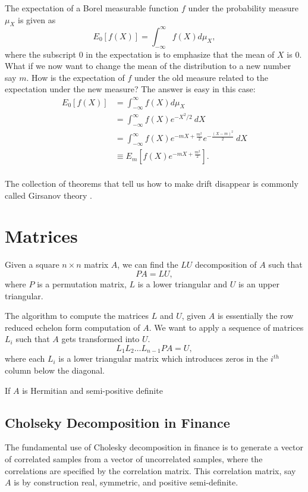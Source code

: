 \documentclass{amsart}
\theoremstyle{plain}
\numberwithin{equation}{section}
\begin{document}
The expectation of a Borel measurable function 
$f$ under the probability measure 
$\mu_X$ is given as
\begin{equation*}
E_0[f(X)] = \int_{-\infty}^{\infty} f(X) d\mu_X,
\end{equation*}
where the subscript $0$ in the expectation is to 
emphasize that the mean of $X$ is $0$. What if
we now want to change the mean of the distribution
to a new number say $m$. How is the expectation of
$f$ under the old measure related to the 
expectation under the new measure?
The answer is easy in this case:
\begin{align*}
E_0[f(X)] &= \int_{-\infty}^{\infty} f(X) d\mu_X \\
					&= \int_{-\infty}^{\infty} f(X) e^{-X^2/2} \: dX \\
					&= \int_{-\infty}^{\infty} f(X) e^{-mX + \frac{m^2}{2}}e^{-\frac{(X-m)^2}{2}} \: dX \\
					&\equiv E_m\left[f(X)e^{-mX + \frac{m^2}{2}}\right].\\
\end{align*}


The collection of theorems that tell us how to make 
drift disappear is commonly called Girsanov theory
\cite[Ch.\ 13]{steele2001stochastic}.


\section{Matrices}
Given a square $n \times n$ matrix $A$, we can find the $LU$ decomposition 
of $A$ such that 
\begin{equation}
PA = LU,
\label{eq:LU}
\end{equation}
where $P$ is a permutation matrix, $L$ is a lower triangular
and $U$ is an upper triangular.

The algorithm to compute the matrices $L$ and $U$, given $A$ is 
essentially the row reduced echelon form computation of $A$. 
We want to apply a sequence of matrices $L_i$ such that 
$A$ gets transformed into $U$. 
\begin{equation}
L_1 L_2 \ldots L_{n-1} PA = U,
\label{}
\end{equation}
where each $L_i$ is a lower triangular matrix
which introduces zeros in the $i^{th}$ column
below the diagonal. 

If $A$ is Hermitian and semi-positive definite

\subsection{Cholseky Decomposition in Finance}
The fundamental use of Cholesky decomposition 
in finance is to generate a vector of correlated
samples from a vector of uncorrelated samples, where
the correlations are specified by the correlation 
matrix. This correlation matrix, say $A$ is by 
construction real, symmetric, and positive semi-definite.
\end{document}
